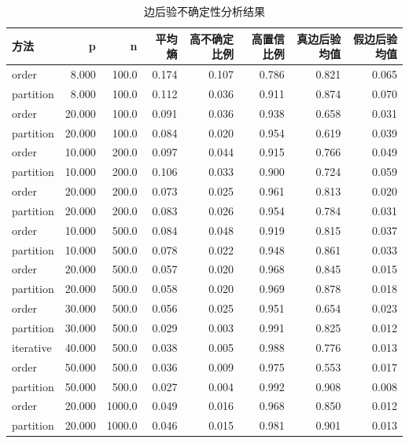 \begin{table}[H]
\centering
\small
\setlength{\tabcolsep}{2pt}
\caption{边后验不确定性分析结果}
\label{tab:posterior_uncertainty}
\begin{tabular}{lrrrrrrr}
\toprule
方法 & p & n & 平均熵 & 高不确定比例 & 高置信比例 & 真边后验均值 & 假边后验均值
\\
\midrule
order & 8.000 & 100.0 & 0.174 & 0.107 & 0.786 & 0.821 & 0.065 \\
partition & 8.000 & 100.0 & 0.112 & 0.036 & 0.911 & 0.874 & 0.070 \\
order & 20.000 & 100.0 & 0.091 & 0.036 & 0.938 & 0.658 & 0.031 \\
partition & 20.000 & 100.0 & 0.084 & 0.020 & 0.954 & 0.619 & 0.039 \\
order & 10.000 & 200.0 & 0.097 & 0.044 & 0.915 & 0.766 & 0.049 \\
partition & 10.000 & 200.0 & 0.106 & 0.033 & 0.900 & 0.724 & 0.059 \\
order & 20.000 & 200.0 & 0.073 & 0.025 & 0.961 & 0.813 & 0.020 \\
partition & 20.000 & 200.0 & 0.083 & 0.026 & 0.954 & 0.784 & 0.031 \\
order & 10.000 & 500.0 & 0.084 & 0.048 & 0.919 & 0.815 & 0.037 \\
partition & 10.000 & 500.0 & 0.078 & 0.022 & 0.948 & 0.861 & 0.033 \\
order & 20.000 & 500.0 & 0.057 & 0.020 & 0.968 & 0.845 & 0.015 \\
partition & 20.000 & 500.0 & 0.058 & 0.020 & 0.969 & 0.878 & 0.018 \\
order & 30.000 & 500.0 & 0.056 & 0.025 & 0.951 & 0.654 & 0.023 \\
partition & 30.000 & 500.0 & 0.029 & 0.003 & 0.991 & 0.825 & 0.012 \\
iterative & 40.000 & 500.0 & 0.038 & 0.005 & 0.988 & 0.776 & 0.013 \\
order & 50.000 & 500.0 & 0.036 & 0.009 & 0.975 & 0.553 & 0.017 \\
partition & 50.000 & 500.0 & 0.027 & 0.004 & 0.992 & 0.908 & 0.008 \\
order & 20.000 & 1000.0 & 0.049 & 0.016 & 0.968 & 0.850 & 0.012 \\
partition & 20.000 & 1000.0 & 0.046 & 0.015 & 0.981 & 0.901 & 0.013 \\
\bottomrule
\end{tabular}
\end{table}
